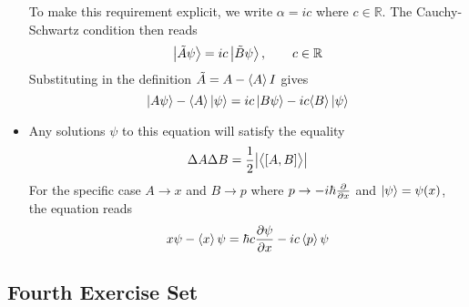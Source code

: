 \documentclass[11pt, a4paper]{article}
\begin{document}
\begin{itemize}
	To make this requirement explicit, we write $ \alpha = i c $ where $ c \in \mathbb{R} $. The Cauchy-Schwartz condition then reads 
	\begin{equation*}
		\ket{\tilde{A}\psi} = i c \ket{\tilde{B}\psi}, \qquad c \in \mathbb{R}
	\end{equation*}
	Substituting in the definition $ \tilde{A} = A - \expval{A}I $ gives
	\begin{equation*}
		\ket{A\psi} - \langle A \rangle\ket{\psi} = ic\ket{B\psi} - ic\langle B \rangle\ket{\psi}
	\end{equation*}
	
	\item Any solutions $ \psi $ to this equation will satisfy the equality
	\begin{equation*}
		  \Delta A \Delta B = \frac{1}{2}\abs{\big\langle [A, B] \big\rangle}
	\end{equation*}
	For the specific case $ A \to x $ and $ B \to p $ where $ p \to  - i \hbar \pdv{}{x} $ and $ \ket{\psi} = \psi(x) $, the equation reads
	\begin{equation*}
		x \psi - \expval{x} \psi = \hbar c \pdv{\psi}{x} - ic \expval{p} \psi
	\end{equation*}
\end{itemize}


\subsection{Fourth Exercise Set}
\end{document}
